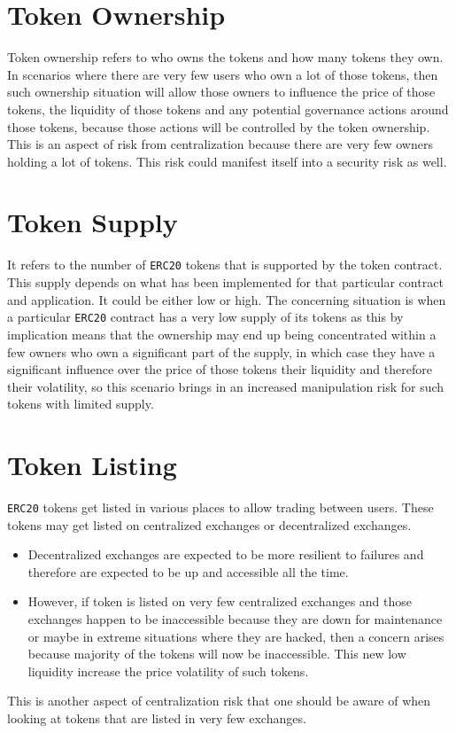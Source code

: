 \section{Token Ownership}
Token ownership refers to who owns the tokens and how many tokens they own. In scenarios where there are very few users who own a lot of those tokens, then such ownership situation will allow those owners to influence the price of those tokens, the liquidity of those tokens and any potential governance actions around those tokens, because those actions will be controlled by the token ownership. This is an aspect of risk from centralization because there are very few owners holding a lot of tokens. This risk could manifest itself into a security risk as well.

\section{Token Supply}
It refers to the number of \verb|ERC20| tokens that is supported by the token contract. This supply depends on what has been implemented for that particular contract and application. It could be either low or high. The concerning situation is when a particular \verb|ERC20| contract has a very low supply of its tokens as this by implication means that the ownership may end up being concentrated within a few owners who own a significant part of the supply, in which case they have a significant influence over the price of those tokens their liquidity and therefore their volatility, so this scenario brings in an increased manipulation risk for such tokens with limited supply.

\section{Token Listing}
\verb|ERC20| tokens get listed in various places to allow trading between users. These tokens may get listed on centralized exchanges or decentralized exchanges.
\begin{itemize}
\item Decentralized exchanges are expected to be more resilient to failures and therefore are expected to be up and accessible all the time.
\item However, if token is listed on very few centralized exchanges and those exchanges happen to be inaccessible because they are down for maintenance or maybe in extreme situations where they are hacked, then a concern arises because majority of the tokens will now be inaccessible. This new low liquidity increase the price volatility of such tokens.
\end{itemize}
This is another aspect of centralization risk that one should be aware of when looking at tokens that are listed in very few exchanges.

